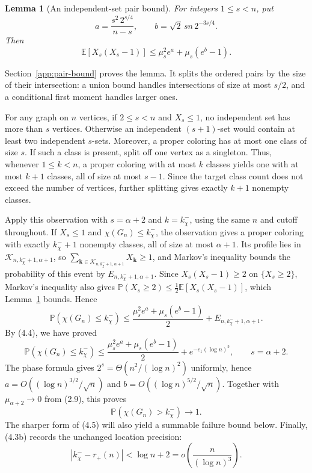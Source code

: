 \documentclass[a4paper,10pt,reqno]{amsart}
\numberwithin{equation}{section}
\theoremstyle{plain}
\newtheorem{lemma}[theorem]{Lemma}
\theoremstyle{remark}
\begin{document}
\begin{lemma}[An independent-set pair bound]\label{lem:independent-pair-tail}
For integers \(1\le s<n\), put
\[
 a=\frac{s^2\,2^{s/4}}{n-s},
 \qquad b=\sqrt2\,sn\,2^{-3s/4}.
\]
Then
\[
 \mathbb E[X_s(X_s-1)]\le \mu_s^2 e^a+\mu_s(e^b-1).
\]
\end{lemma}
Section~\ref{app:pair-bound} proves the lemma. It splits the ordered pairs
by the size of their intersection: a union bound handles intersections of
size at most $s/2$, and a conditional first moment handles larger ones.

For any graph on \(n\) vertices, if \(2\le s<n\) and \(X_s\le1\), no
independent set has more than \(s\) vertices. Otherwise an independent
\((s+1)\)-set would contain at least two independent \(s\)-sets.
Moreover, a proper coloring has at most one class of size \(s\).
If such a class is present, split off one vertex as a singleton. Thus, whenever
\(1\le k<n\), a proper coloring with at most \(k\) classes yields one with
at most \(k+1\) classes, all of size at most \(s-1\). Since the target class
count does not exceed the number of vertices, further splitting gives exactly
\(k+1\) nonempty classes.

Apply this observation with \(s=\alpha+2\) and \(k=k_\chi^-\), using the
same \(n\) and cutoff throughout. If \(X_s\le1\) and
\(\chi(G_n)\le k_\chi^-\), the observation gives a proper coloring with
exactly \(k_\chi^-+1\) nonempty classes, all of size at most \(\alpha+1\).
Its profile lies in \(\mathcal K_{n,k_\chi^-+1,\alpha+1}\), so
\(\sum_{\mathbf k\in\mathcal K_{n,k_\chi^-+1,\alpha+1}}X_{\mathbf k}\ge1\),
and Markov's inequality bounds the probability of this event by
\(E_{n,k_\chi^-+1,\alpha+1}\). Since \(X_s(X_s-1)\ge2\) on
\(\{X_s\ge2\}\), Markov's inequality also gives
\(\mathbb P(X_s\ge2)\le\frac12\mathbb E[X_s(X_s-1)]\), which
Lemma~\ref{lem:independent-pair-tail} bounds. Hence
\[
 \mathbb P(\chi(G_n)\le k_\chi^-)
 \le\frac{\mu_s^2e^a+\mu_s(e^b-1)}2
       +E_{n,k_\chi^-+1,\alpha+1}.
\]
By (4.4), we have proved
\begin{equation*}
 \mathbb P(\chi(G_n)\le k_\chi^-)
 \le\frac{\mu_s^2e^a+\mu_s(e^b-1)}2+e^{-c_1(\log n)^3},
 \qquad s=\alpha+2.
 \tag{4.5}
\end{equation*}
The phase formula gives \(2^s=\Theta(n^2/(\log n)^2)\) uniformly, hence
\(a=O((\log n)^{3/2}/\sqrt n)\) and
\(b=O((\log n)^{5/2}/\sqrt n)\).
Together with \(\mu_{\alpha+2}\to0\) from (2.9), this proves
\begin{equation*}
 \mathbb P(\chi(G_n)>k_\chi^-)\longrightarrow1.
 \tag{4.6}
\end{equation*}
The sharper form of (4.5) will also yield a summable failure bound below.
Finally, (4.3b) records the unchanged location precision:
\begin{equation*}
 |k_\chi^--r_+(n)|
 <\log n+2=o\!\left(\frac n{(\log n)^3}\right).
 \tag{4.7}
\end{equation*}
\end{document}
